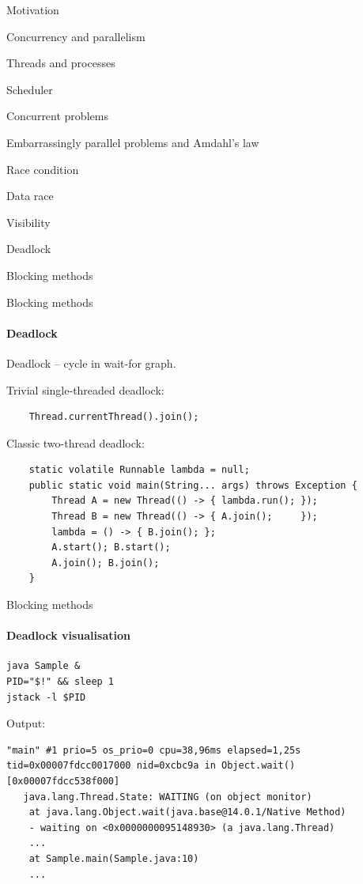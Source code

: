 \begin{section}{Motivation}
\begin{section}{Concurrency and parallelism}
\begin{section}{Threads and processes}
\begin{section}{Scheduler}
\begin{section}{Concurrent problems}
\begin{subsection}{Embarrassingly parallel problems and Amdahl's law}
\begin{subsection}{Race condition}
\begin{subsection}{Data race}
\begin{subsection}{Visibility}
\begin{subsection}{Deadlock}
\begin{frame}{Blocking methods}
\end{frame}











\begin{frame}[fragile]{Blocking methods}
\framesubtitle{Deadlock}

Deadlock -- cycle in wait-for graph.

Trivial single-threaded deadlock:
\pause
\begin{verbatim}
    Thread.currentThread().join();
\end{verbatim}

\pause
Classic two-thread deadlock:

\begin{verbatim}
    static volatile Runnable lambda = null; 
    public static void main(String... args) throws Exception {
        Thread A = new Thread(() -> { lambda.run(); });
        Thread B = new Thread(() -> { A.join();     }); 
        lambda = () -> { B.join(); };
        A.start(); B.start();
        A.join(); B.join();
    }
\end{verbatim}
\end{frame}


\begin{frame}[fragile]{Blocking methods}
\framesubtitle{Deadlock visualisation}

\begin{verbatim}
java Sample & 
PID="$!" && sleep 1
jstack -l $PID
\end{verbatim}

\pause

Output:
\begin{verbatim}
"main" #1 prio=5 os_prio=0 cpu=38,96ms elapsed=1,25s tid=0x00007fdcc0017000 nid=0xcbc9a in Object.wait()  [0x00007fdcc538f000]
   java.lang.Thread.State: WAITING (on object monitor)
    at java.lang.Object.wait(java.base@14.0.1/Native Method)
    - waiting on <0x0000000095148930> (a java.lang.Thread)
    ...
    at Sample.main(Sample.java:10)
    ...
\end{verbatim}


\end{frame}
\end{subsection}
\end{subsection}
\end{subsection}
\end{subsection}
\end{subsection}
\end{section}
\end{section}
\end{section}
\end{section}
\end{section}
